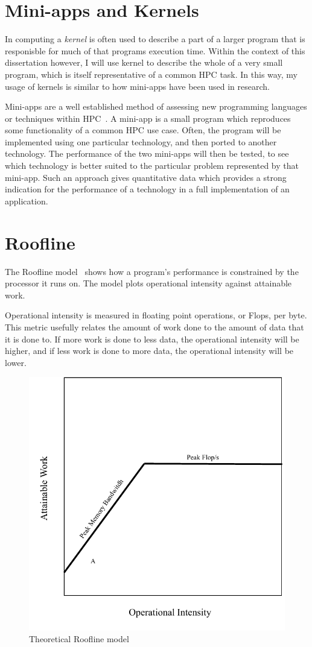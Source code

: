 \section{Mini-apps and Kernels}
In computing a {\em kernel} is often used to describe a part of a larger program that is responisble for much of that programs execution time. Within the context of this dissertation however, I will use kernel to describe the whole of a very small program, which is itself representative of a common HPC task. In this way, my usage of kernels is similar to how mini-apps have been used in research.

Mini-apps are a well established method of assessing new programming languages or techniques within HPC~\cite{Mallinson:2014, Slaughter:2015, martineau2017arch}. A mini-app is a small program which reproduces some functionality of a common HPC use case. Often, the program will be implemented using one particular technology, and then ported to another technology. The performance of the two mini-apps will then be tested, to see which technology is better suited to the particular problem represented by that mini-app. Such an approach gives quantitative data which provides a strong indication for the performance of a technology in a full implementation of an application. 
\section{Roofline}
The Roofline model~\cite{williams2009roofline} shows how a program's performance is constrained by the processor it runs on. The model plots operational intensity against attainable work. 

Operational intensity is measured in floating point operations, or Flops, per byte.
This metric usefully relates the amount of work done to the amount of data that it is done to. If more work is done to less data, the operational intensity will be higher, and if less work is done to more data, the operational intensity will be lower.


\begin{figure}[h]
\centering
\includegraphics[width=.66\linewidth]{figs/roofline.pdf}
\caption{Theoretical Roofline model}\label{fig:roof-eg}
\end{figure}

